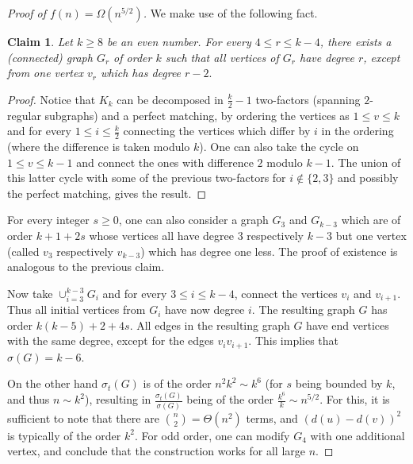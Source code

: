 \documentclass[a4paper,11pt]{article}
\newtheorem{claim}[defi]{Claim}
\newcommand*{\myproofname}{Proof}
\newenvironment{claimproof}[1][\myproofname]{\begin{proof}[#1]\renewcommand*{\qedsymbol}{\(\diamondsuit\)}}{\end{proof}}
\begin{document}
\begin{proof}[Proof of $f(n)= \Omega(n^{5/2})$]
We make use of the following fact.
\begin{claim}
    Let $k\ge 8$ be an even number. For every $4\le r \le k-4$, there exists a (connected) graph $G_r$ of order $k$ such that all vertices of $G_r$ have degree $r$, except from one vertex $v_r$ which has degree $r-2.$
\end{claim}
\begin{claimproof}
    Notice that $K_k$ can be decomposed in $\frac k2-1$ two-factors (spanning $2$-regular subgraphs) and a perfect matching, by ordering the vertices as $1\le v \le k$ and for every $1 \le i \le \frac k2$ connecting the vertices which differ by $i$ in the ordering (where the difference is taken modulo $k$).
    One can also take the cycle on $1 \le v \le k-1$ and connect the ones with difference $2$ modulo $k-1$.
    The union of this latter cycle with some of the previous two-factors for $i \not \in \{2,3\}$ and possibly the perfect matching, gives the result.
\end{claimproof}

For every integer $s\ge 0$, one can also consider a graph $G_3$ and $G_{k-3}$ which are of order $k+1+2s$ whose vertices all have degree $3$ respectively $k-3$ but one vertex (called $v_3$ respectively $v_{k-3}$) which has degree one less. The proof of existence is analogous to the previous claim.

Now take $\cup_{i=3}^{k-3} G_i $ and for every $3 \le i \le k-4$, connect the vertices $v_i$ and $v_{i+1}.$
Thus all initial vertices from $G_i$ have now degree $i$.
The resulting graph $G$ has order $k(k-5)+2+4s.$
All edges in the resulting graph $G$ have end vertices with the same degree, except for the edges $v_iv_{i+1}.$
This implies that $\sigma(G)=k-6.$

On the other hand $\sigma_t(G)$ is of the order $n^2k^2 \sim k^6$ (for $s$ being bounded by $k$, and thus $n \sim k^2$), resulting in $\frac{\sigma_t(G)}{\sigma(G)}$ being of the order $\frac{k^6}{k} \sim n^{5/2}.$
For this, it is sufficient to note that there are $\binom n2 = \Theta(n^2)$ terms, and $(d(u)-d(v))^2$ is typically of the order $k^2$.
For odd order, one can modify $G_4$ with one additional vertex, and conclude that the construction works for all large $n.$
\end{proof}
\end{document}
